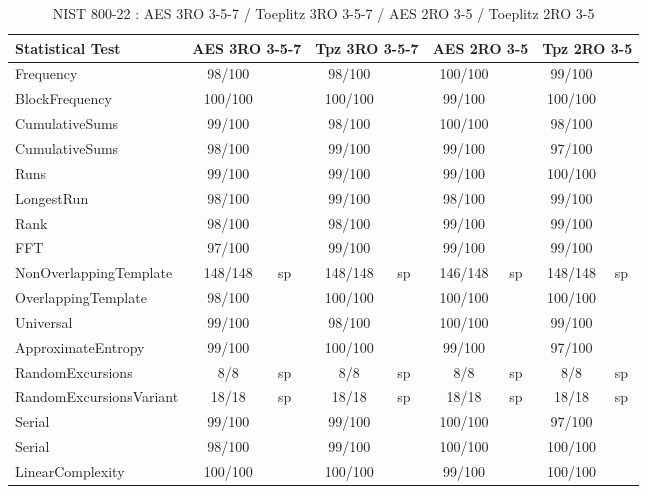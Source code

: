 \begin{table}[H]
\centering
\caption{NIST 800-22 :  AES 3RO 3-5-7 / Toeplitz 3RO 3-5-7 / AES 2RO 3-5 / Toeplitz 2RO 3-5}
\label{tab:ch5_aes-ctr_2RO_8I}
\begin{tabular}{|l|c|l|c|l|c|l|c|l|}
\hline
\textbf{Statistical Test} & \multicolumn{2}{c|}{\textbf{AES 3RO 3-5-7}} & \multicolumn{2}{c|}{\textbf{Tpz 3RO 3-5-7}} & \multicolumn{2}{c|}{\textbf{AES 2RO 3-5}} & \multicolumn{2}{c|}{\textbf{Tpz 2RO 3-5}} \\ \hline
Frequency               &  98/100 &     &  98/100 &     & 100/100 &     &  99/100 &     \\ \hline
BlockFrequency          & 100/100 &     & 100/100 &     &  99/100 &     & 100/100 &     \\ \hline
CumulativeSums          &  99/100 &     &  98/100 &     & 100/100 &     &  98/100 &     \\ \hline
CumulativeSums          &  98/100 &     &  99/100 &     &  99/100 &     &  97/100 &     \\ \hline
Runs                    &  99/100 &     &  99/100 &     &  99/100 &     & 100/100 &     \\ \hline
LongestRun              &  98/100 &     &  99/100 &     &  98/100 &     &  99/100 &     \\ \hline
Rank                    &  98/100 &     &  98/100 &     &  99/100 &     &  99/100 &     \\ \hline
FFT                     &  97/100 &     &  99/100 &     &  99/100 &     &  99/100 &     \\ \hline
NonOverlappingTemplate  & 148/148 & sp  & 148/148 & sp  & 146/148 & sp  &  148/148 & sp  \\ \hline
OverlappingTemplate     &  98/100 &     & 100/100 &     & 100/100 &     & 100/100 &     \\ \hline
Universal               &  99/100 &     &  98/100 &     & 100/100 &     &  99/100 &     \\ \hline
ApproximateEntropy      &  99/100 &     & 100/100 &     &  99/100 &     &  97/100 &     \\ \hline
RandomExcursions        &     8/8 & sp  &     8/8 & sp  &     8/8 & sp  &     8/8 & sp  \\ \hline
RandomExcursionsVariant &   18/18 & sp  &   18/18 & sp  &   18/18 & sp  &   18/18 & sp  \\ \hline
Serial                  &  99/100 &     &  99/100 &     & 100/100 &     &  97/100 &     \\ \hline
Serial                  &  98/100 &     &  99/100 &     & 100/100 &     & 100/100 &     \\ \hline
LinearComplexity        & 100/100 &     & 100/100 &     &  99/100 &     & 100/100 &     \\ \hline
\end{tabular}
\end{table}


